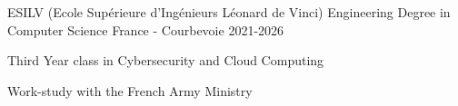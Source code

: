 

\begin{cventries}

	\cventry
	{ESILV (Ecole Supérieure d'Ingénieurs Léonard de Vinci)} %
	{Engineering Degree in Computer Science} %
	{France - Courbevoie} %
	{2021-2026} %
	{
		\begin{cvitems} %
			\item {Third Year class in Cybersecurity and Cloud Computing}
			\item { Work-study with the French Army Ministry}
		\end{cvitems}
	}
	{}

\end{cventries}
